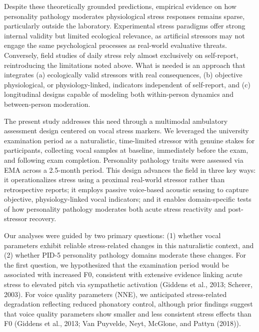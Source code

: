 \documentclass[
  english,
  man]{apa6}
\begin{document}
Despite these theoretically grounded predictions, empirical evidence on how personality pathology moderates physiological stress responses remains sparse, particularly outside the laboratory. Experimental stress paradigms offer strong internal validity but limited ecological relevance, as artificial stressors may not engage the same psychological processes as real-world evaluative threats. Conversely, field studies of daily stress rely almost exclusively on self-report, reintroducing the limitations noted above. What is needed is an approach that integrates (a) ecologically valid stressors with real consequences, (b) objective physiological, or physiology-linked, indicators independent of self-report, and (c) longitudinal designs capable of modeling both within-person dynamics and between-person moderation.

The present study addresses this need through a multimodal ambulatory assessment design centered on vocal stress markers. We leveraged the university examination period as a naturalistic, time-limited stressor with genuine stakes for participants, collecting vocal samples at baseline, immediately before the exam, and following exam completion. Personality pathology traits were assessed via EMA across a 2.5-month period. This design advances the field in three key ways: it operationalizes stress using a proximal real-world stressor rather than retrospective reports; it employs passive voice-based acoustic sensing to capture objective, physiology-linked vocal indicators; and it enables domain-specific tests of how personality pathology moderates both acute stress reactivity and post-stressor recovery.

Our analyses were guided by two primary questions: (1) whether vocal parameters exhibit reliable stress-related changes in this naturalistic context, and (2) whether PID-5 personality pathology domains moderate these changes. For the first question, we hypothesized that the examination period would be associated with increased F0, consistent with extensive evidence linking acute stress to elevated pitch via sympathetic activation (Giddens et al., 2013; Scherer, 2003). For voice quality parameters (NNE), we anticipated stress-related degradation reflecting reduced phonatory control, although prior findings suggest that voice quality parameters show smaller and less consistent stress effects than F0 (Giddens et al., 2013; Van Puyvelde, Neyt, McGlone, and Pattyn (2018)).
\end{document}
